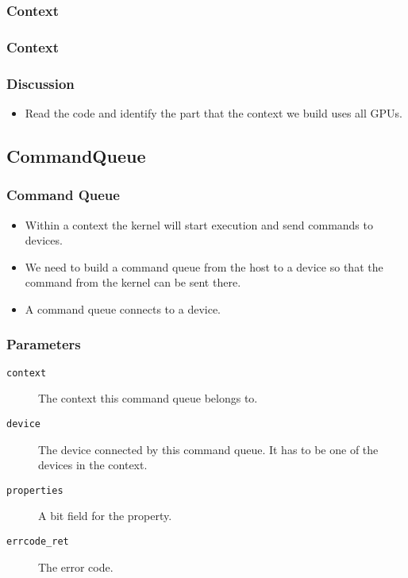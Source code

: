 \documentclass{beamer}
\begin{document}
\begin{frame}
  \frametitle{Context}
\end{frame}

\begin{frame}
  \frametitle{Context}
  \centerline{}
\end{frame}

\begin{frame}
  \frametitle{Discussion}
  \begin{itemize}
  \item Read the code and identify the part that the context we
    build uses all GPUs.
  \end{itemize}
\end{frame}

\subsection{CommandQueue}

\begin{frame}
  \frametitle{Command Queue}
  \begin{itemize}
  \item Within a context the kernel will start execution and send
    commands to devices.
  \item We need to build a command queue from the host to a device so
    that the command from the kernel can be sent there.
  \item A command queue connects to a device.
  \end{itemize}
\end{frame}

\begin{frame}
\end{frame}

\begin{frame}
  \frametitle{Parameters}
  \begin{description}
  \item [\tt context] The context this command queue belongs to.
  \item [\tt device] The device connected by this command queue. It has
    to be one of the devices in the context.
  \item [\tt properties] A bit field for the property.
  \item [\tt errcode\_ret] The error code.
  \end{description}
\end{frame}
\end{document}
